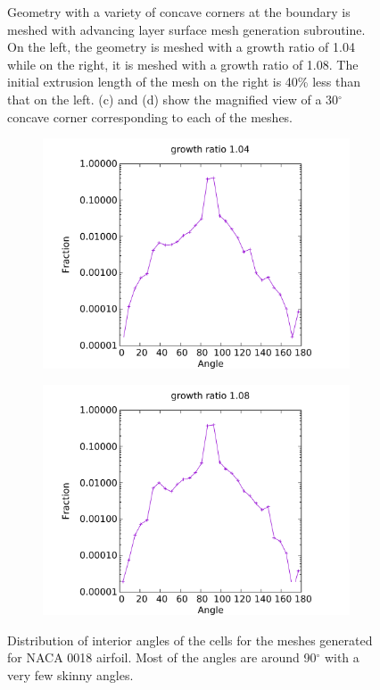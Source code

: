 \documentclass[conf]{new-aiaa}
\begin{document}
\begin{figure}
\begin{subfigure}{0.4\textwidth}
\caption{}
\label{fig-variousAngle-corner-high}
\end{subfigure}
\caption{Geometry with a variety of concave corners at the boundary is meshed with advancing layer surface mesh generation subroutine. On the left, the geometry is meshed with a growth ratio of 1.04 while on the right, it is meshed with a growth ratio of 1.08. The initial extrusion length of the mesh on the right is 40\% less than that on the left. (c) and (d) show the magnified view of a 30$^\circ$ concave corner corresponding to each of the meshes.}
\label{fig-variousAngle}
\end{figure}

\begin{figure}
\centering
\begin{subfigure}{0.5\textwidth}
\centering
\includegraphics[width=0.9\linewidth]{meshCases/variousAngle-x0.5-g1.04/angleDistribution.pdf}
\caption{}
\label{fig-va-dist-low}
\end{subfigure}%
\begin{subfigure}{0.5\textwidth}
\centering
\includegraphics[width = 0.9\linewidth]{meshCases/variousAngle-x0.3-g1.08/angleDistribution.pdf}
\caption{}
\label{fig-va-dist-high}
\end{subfigure}
\caption{Distribution of interior angles of the cells for the meshes generated for NACA 0018 airfoil. Most of the angles are around 90$^\circ$ with a very few skinny angles.}
\label{fig-va-angle-distribution}
\end{figure}
\end{document}
